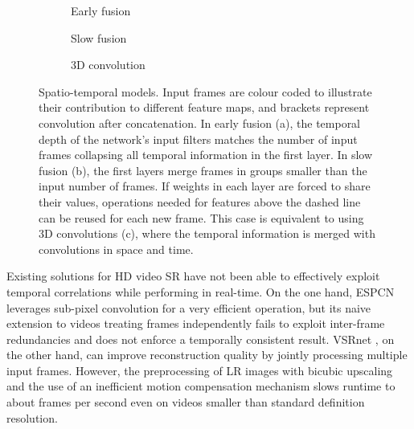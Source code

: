 \documentclass[10pt,twocolumn,letterpaper]{article}
\begin{document}
\begin{figure*}
  \centering
  \begin{subfigure}[b]{0.32\textwidth}
      \centering
      \caption{Early fusion}
      \label{fig:early-fusion}
  \end{subfigure}
  \hspace{\fill}
  \begin{subfigure}[b]{0.32\textwidth}
      \centering
      \caption{Slow fusion}
      \label{fig:slow-fusion}
  \end{subfigure}
  \hspace{\fill}
  \begin{subfigure}[b]{0.32\textwidth}
      \centering
      \caption{3D convolution}
      \label{fig:3dconv}
  \end{subfigure}
  \caption{Spatio-temporal models. Input frames are colour coded to illustrate their contribution to different feature maps, and brackets represent convolution after concatenation. In early fusion (a), the temporal depth of the network's input filters matches the number of input frames collapsing all temporal information in the first layer. In slow fusion (b), the first layers merge frames in groups smaller than the input number of frames. If weights in each layer are forced to share their values, operations needed for features above the dashed line can be reused for each new frame. This case is equivalent to using 3D convolutions (c), where the temporal information is merged with convolutions in space and time.}
\label{fig:st-networks}
\end{figure*}

Existing solutions for \gls{HD} video \gls{SR} have not been able to effectively exploit temporal correlations while performing in real-time. On the one hand, ESPCN \cite{Shi2016} leverages sub-pixel convolution for a very efficient operation, but its naive extension to videos treating frames independently fails to exploit inter-frame redundancies and does not enforce a temporally consistent result. VSRnet \cite{Kappeler2016}, on the other hand, can improve reconstruction quality by jointly processing multiple input frames. However, the preprocessing of \gls{LR} images with bicubic upscaling and the use of an inefficient motion compensation mechanism slows runtime to about  frames per second even on videos smaller than standard definition resolution.
\end{document}
